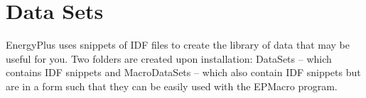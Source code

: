 \section{Data Sets}\label{data-sets}

EnergyPlus uses snippets of IDF files to create the library of data that may be useful for you. Two folders are created upon installation: DataSets -- which contains IDF snippets and MacroDataSets -- which also contain IDF snippets but are in a form such that they can be easily used with the EPMacro program.
